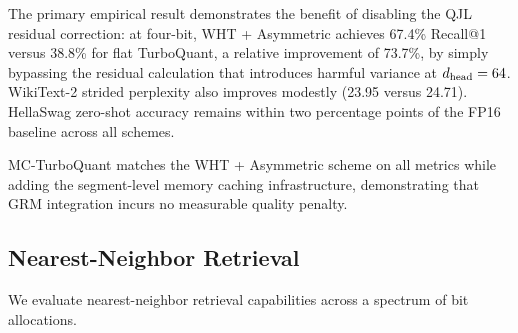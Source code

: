 The primary empirical result demonstrates the benefit of disabling the QJL residual correction: at four-bit,
WHT + Asymmetric achieves 67.4\% Recall@1 versus 38.8\% for flat
TurboQuant, a relative improvement of 73.7\%, by simply bypassing
the residual calculation that introduces harmful variance at
$d_{\text{head}} = 64$.
WikiText-2 strided perplexity also improves modestly (23.95 versus
24.71).
HellaSwag zero-shot accuracy remains within two percentage points of
the FP16 baseline across all schemes.

MC-TurboQuant matches the WHT + Asymmetric scheme on all metrics while
adding the segment-level memory caching infrastructure, demonstrating
that GRM integration incurs no measurable quality penalty.

\subsection{Nearest-Neighbor Retrieval}
\label{sec:results:nn}

We evaluate nearest-neighbor retrieval capabilities across a spectrum of bit allocations.

